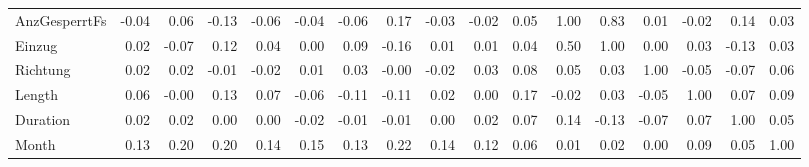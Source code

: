 \begin{tabular}{lrrrrrrrrrrrrrrrr}
AnzGesperrtFs &    -0.04 &     0.06 &    -0.13 &    -0.06 &     -0.04 &     -0.06 &      0.17 &  -0.03 &  -0.02 &     0.05 &           1.00 &    0.83 &      0.01 &   -0.02 &      0.14 &   0.03 \\
Einzug        &     0.02 &    -0.07 &     0.12 &     0.04 &      0.00 &      0.09 &     -0.16 &   0.01 &   0.01 &     0.04 &           0.50 &    1.00 &      0.00 &    0.03 &     -0.13 &   0.03 \\
Richtung      &     0.02 &     0.02 &    -0.01 &    -0.02 &      0.01 &      0.03 &     -0.00 &  -0.02 &   0.03 &     0.08 &           0.05 &    0.03 &      1.00 &   -0.05 &     -0.07 &   0.06 \\
Length        &     0.06 &    -0.00 &     0.13 &     0.07 &     -0.06 &     -0.11 &     -0.11 &   0.02 &   0.00 &     0.17 &          -0.02 &    0.03 &     -0.05 &    1.00 &      0.07 &   0.09 \\
Duration      &     0.02 &     0.02 &     0.00 &     0.00 &     -0.02 &     -0.01 &     -0.01 &   0.00 &   0.02 &     0.07 &           0.14 &   -0.13 &     -0.07 &    0.07 &      1.00 &   0.05 \\
Month         &     0.13 &     0.20 &     0.20 &     0.14 &      0.15 &      0.13 &      0.22 &   0.14 &   0.12 &     0.06 &           0.01 &    0.02 &      0.00 &    0.09 &      0.05 &   1.00 \\
\bottomrule
\end{tabular}
